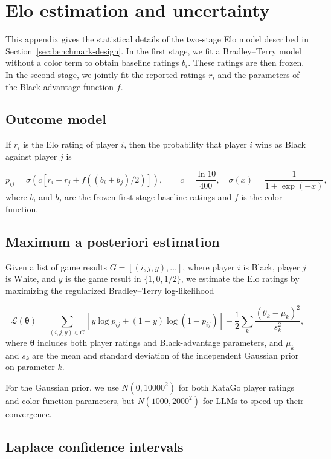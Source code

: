 \documentclass{article}
\begin{document}
\section{Elo estimation and uncertainty}
\label{app:elo-estimation}

This appendix gives the statistical details of the two-stage Elo model described
in Section~\ref{sec:benchmark-design}. In the first stage, we fit a Bradley--Terry model without a color
term to obtain baseline ratings $b_i$. These ratings are then frozen. In the
second stage, we jointly fit the reported ratings $r_i$ and the parameters of
the Black-advantage function $f$.

\subsection{Outcome model}

If $r_i$ is the Elo rating of player $i$, then the probability that player $i$ wins as Black against player $j$ is

\[
p_{ij}
=
\sigma\!\left(
c\left[
r_i-r_j+f((b_i+b_j)/2)
\right]
\right),
\qquad
c=\frac{\ln 10}{400},\quad \sigma(x)=\frac{1}{1+\exp(-x)},
\]
where $b_i$ and $b_j$ are the frozen first-stage baseline ratings and
$f$ is the color function.

\subsection{Maximum a posteriori estimation}

Given a list of game results $G = [(i,j,y),\ldots]$, where player $i$ is Black, player $j$ is White, and $y$ is the game result in $\{1,0,1/2\}$, we estimate the Elo ratings by maximizing the regularized Bradley--Terry log-likelihood

\[
\mathcal{L}(\boldsymbol{\theta})
=
\sum_{(i,j,y)\in G}
\left[
y\log p_{ij}+(1-y)\log(1-p_{ij})
\right]
-\frac{1}{2}
\sum_k\frac{(\theta_k-\mu_k)^2}{s_k^2},
\]
where $\boldsymbol{\theta}$ includes both player ratings and Black-advantage
parameters, and $\mu_k$ and $s_k$ are the mean and standard deviation of the
independent Gaussian prior on parameter $k$.

For the Gaussian prior, we use $N(0, 10000^2)$ for both KataGo player ratings and color-function parameters, but $N(1000, 2000^2)$ for LLMs to speed up their convergence.


\subsection{Laplace confidence intervals}
\end{document}
